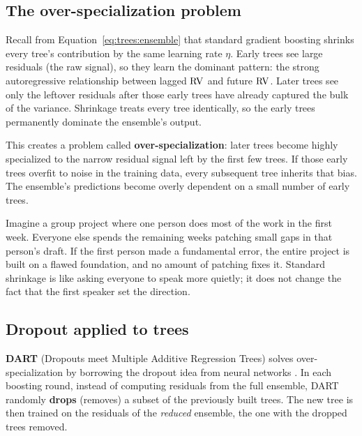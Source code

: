 \subsection*{The over-specialization problem}

Recall from Equation~\ref{eq:trees:ensemble} that standard gradient boosting
shrinks every tree's contribution by the same learning rate $\eta$.  Early
trees see large residuals (the raw signal), so they learn the dominant
pattern: the strong autoregressive relationship between lagged $\operatorname{RV}$ and
future $\operatorname{RV}$.  Later trees see only the leftover residuals after those early
trees have already captured the bulk of the variance.  Shrinkage treats every
tree identically, so the early trees permanently dominate the ensemble's
output.

This creates a problem called \textbf{over-specialization}: later trees
become highly specialized to the narrow residual signal left by the first
few trees.  If those early trees overfit to noise in the training data, every
subsequent tree inherits that bias.  The ensemble's predictions become overly
dependent on a small number of early trees.

\begin{intuition}
Imagine a group project where one person does most of the work in the first
week.  Everyone else spends the remaining weeks patching small gaps in that
person's draft.  If the first person made a fundamental error, the entire
project is built on a flawed foundation, and no amount of patching fixes it.
Standard shrinkage is like asking everyone to speak more quietly; it does not
change the fact that the first speaker set the direction.
\end{intuition}

\subsection*{Dropout applied to trees}

\textbf{DART} (Dropouts meet Multiple Additive Regression Trees) solves
over-specialization by borrowing the dropout idea from neural networks
\citep{VinayakGilad2015}.  In each boosting round, instead of computing
residuals from the full ensemble, DART randomly \textbf{drops} (removes) a
subset of the previously built trees.  The new tree is then trained on the
residuals of the \emph{reduced} ensemble, the one with the dropped trees
removed.

